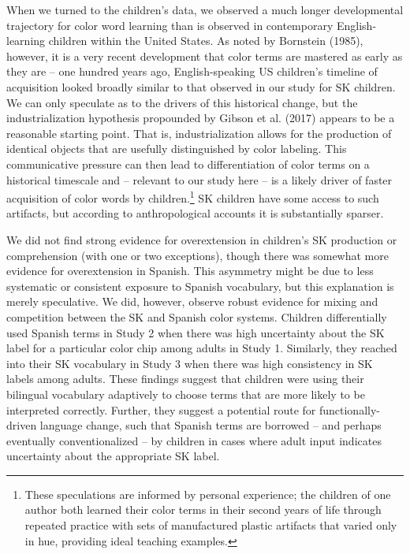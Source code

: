 \documentclass[
  ,apa7,floatsintext]{apa6}
\begin{document}
When we turned to the children's data, we observed a much longer developmental trajectory for color word learning than is observed in contemporary English-learning children within the United States. As noted by Bornstein (1985), however, it is a very recent development that color terms are mastered as early as they are -- one hundred years ago, English-speaking US children's timeline of acquisition looked broadly similar to that observed in our study for SK children. We can only speculate as to the drivers of this historical change, but the industrialization hypothesis propounded by Gibson et al. (2017) appears to be a reasonable starting point. That is, industrialization allows for the production of identical objects that are usefully distinguished by color labeling. This communicative pressure can then lead to differentiation of color terms on a historical timescale and -- relevant to our study here -- is a likely driver of faster acquisition of color words by children.\footnote{These speculations are informed by personal experience; the children of one author both learned their color terms in their second years of life through repeated practice with sets of manufactured plastic artifacts that varied only in hue, providing ideal teaching examples.} SK children have some access to such artifacts, but according to anthropological accounts it is substantially sparser.

We did not find strong evidence for overextension in children's SK production or comprehension (with one or two exceptions), though there was somewhat more evidence for overextension in Spanish. This asymmetry might be due to less systematic or consistent exposure to Spanish vocabulary, but this explanation is merely speculative. We did, however, observe robust evidence for mixing and competition between the SK and Spanish color systems. Children differentially used Spanish terms in Study 2 when there was high uncertainty about the SK label for a particular color chip among adults in Study 1. Similarly, they reached into their SK vocabulary in Study 3 when there was high consistency in SK labels among adults. These findings suggest that children were using their bilingual vocabulary adaptively to choose terms that are more likely to be interpreted correctly. Further, they suggest a potential route for functionally-driven language change, such that Spanish terms are borrowed -- and perhaps eventually conventionalized -- by children in cases where adult input indicates uncertainty about the appropriate SK label.
\end{document}
